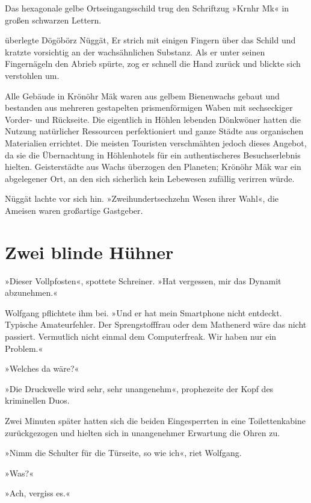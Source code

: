 Das hexagonale gelbe Ortseingangsschild trug den Schriftzug  »Krnhr Mk« in großen schwarzen Lettern.

 überlegte Dögöbörz Nüggät,  Er strich mit einigen Fingern über das Schild und kratzte vorsichtig an der wachsähnlichen Substanz. Als er unter seinen Fingernägeln den Abrieb spürte, zog er schnell die Hand zurück und blickte sich verstohlen um. 

Alle Gebäude in Krönöhr Mäk waren aus gelbem Bienenwachs gebaut und bestanden aus mehreren gestapelten prismenförmigen Waben mit sechseckiger Vorder- und Rückseite. Die eigentlich in Höhlen lebenden Dönkwöner hatten die Nutzung natürlicher Ressourcen perfektioniert und ganze Städte aus organischen Materialien errichtet. Die meisten Touristen verschmähten jedoch dieses Angebot, da sie die Übernachtung in Höhlenhotels für ein authentischeres Besuchserlebnis hielten. Geisterstädte aus Wachs überzogen den Planeten; Krönöhr Mäk war ein abgelegener Ort, an den sich sicherlich kein Lebewesen zufällig verirren würde.

Nüggät lachte vor sich hin. »Zweihundertsechzehn Wesen ihrer Wahl«, die Ameisen waren großartige Gastgeber.


\chapter{Zwei blinde Hühner}

»Dieser Vollpfosten«, spottete Schreiner. »Hat vergessen, mir das Dynamit abzunehmen.«

Wolfgang pflichtete ihm bei. »Und er hat mein Smartphone nicht entdeckt. Typische Amateurfehler. Der Sprengstofffrau oder dem Mathenerd wäre das nicht passiert. Vermutlich nicht einmal dem Computerfreak. Wir haben nur ein Problem.«

»Welches da wäre?«

»Die Druckwelle wird sehr, sehr unangenehm«, prophezeite der Kopf des kriminellen Duos.

Zwei Minuten später hatten sich die beiden Eingesperrten in eine Toilettenkabine zurückgezogen und hielten sich in unangenehmer Erwartung die Ohren zu.

»Nimm die Schulter für die Türseite, so wie ich«, riet Wolfgang.

»Was?«

»Ach, vergiss es.«

